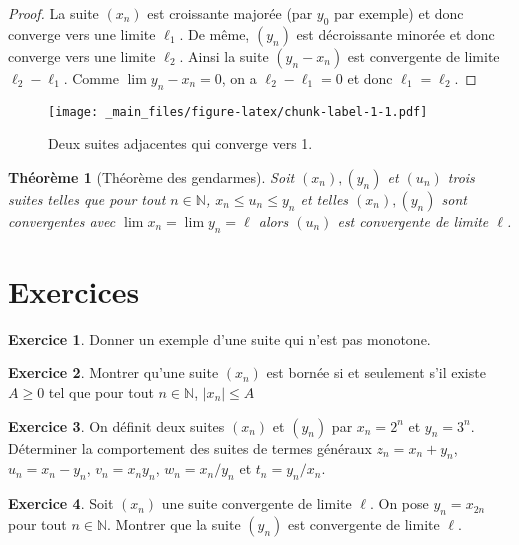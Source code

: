 \documentclass[
]{book}
\newtheorem{theorem}{Théorème}[chapter]
\theoremstyle{definition}
\theoremstyle{definition}
\theoremstyle{definition}
\newtheorem{exercise}{Exercice}[chapter]
\theoremstyle{definition}
\theoremstyle{remark}
\begin{document}
\begin{proof}
La suite \((x_n)\) est croissante majorée (par \(y_0\) par exemple) et donc converge vers une limite \(\ell_1\). De même, \((y_n)\) est décroissante minorée et donc converge vers une limite \(\ell_2\). Ainsi la suite \((y_n-x_n)\) est convergente de limite \(\ell_2-\ell_1\). Comme \(\lim y_n-x_n=0\), on a \(\ell_2-\ell_1=0\) et donc \(\ell_1=\ell_2\).
\end{proof}

\begin{figure}
\centering
\texttt{[image: \_main\_files/figure-latex/chunk-label-1-1.pdf]}
\caption{\label{fig:chunk-label-1}Deux suites adjacentes qui converge vers 1.}
\end{figure}

\begin{theorem}[Théorème des gendarmes]
Soit \((x_n), (y_n)\) et \((u_n)\) trois suites telles que pour tout \(n\in\mathbb{N}\), \(x_n\leq u_n\leq y_n\) et telles \((x_n), (y_n)\) sont convergentes avec \(\lim x_n=\lim y_n=\ell\) alors \((u_n)\) est convergente de limite \(\ell\).
\end{theorem}

\hypertarget{exercices}{%
\section{Exercices}\label{exercices}}

\begin{exercise}
Donner un exemple d'une suite qui n'est pas monotone.
\end{exercise}

\begin{exercise}
Montrer qu'une suite \((x_n)\) est bornée si et seulement s'il existe \(A\geq 0\) tel que pour tout \(n\in \mathbb{N}\), \(|x_n|\leq A\)
\end{exercise}

\begin{exercise}
On définit deux suites \((x_n)\) et \((y_n)\) par \(x_n=2^n\) et \(y_n=3^n\). Déterminer la comportement des suites de termes généraux \(z_n=x_n+y_n\), \(u_n=x_n-y_n\), \(v_n=x_ny_n\), \(w_n=x_n/y_n\) et \(t_n=y_n/x_n\).
\end{exercise}

\begin{exercise}
Soit \((x_n)\) une suite convergente de limite \(\ell\). On pose \(y_n=x_{2n}\) pour tout \(n\in\mathbb{N}\). Montrer que la suite \((y_n)\) est convergente de limite \(\ell\).
\end{exercise}
\end{document}
